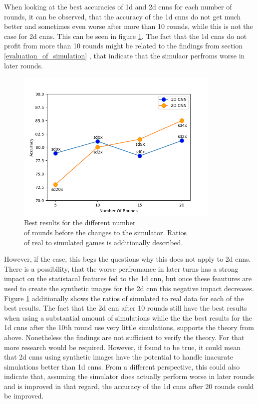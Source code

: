 \begin{minipage}[c]{0.4\textwidth}
	When looking at the best accuracies of 1d and 2d cnns for each number of rounds, it can be observed, that the accuracy of the 1d cnns do not get much better and sometimes even worse after more than 10 rounds, while this is not the case for 2d cnns. This can be seen in figure \ref{fig:bestAccPlot}. The fact that the 1d cnns do not profit from more than 10 rounds might be related to the findings from section \ref{evaluation_of_simulation} , that indicate that the simulaor perfroms worse in later rounds.
\end{minipage}
\begin{minipage}[c]{0.6\textwidth}
	\begin{figure}[H]
		\centering
		\includegraphics[width=9.8cm]{images/bestAccPlot.png}
		\caption[Bild kurz]{Best results for the different number\\\hspace{0\textheight} of rounds before the changes to the simulator. Ratios\\\hspace{0\textheight} of real to simulated games is additionally described.}
		\label{fig:bestAccPlot}
	\end{figure}
\end{minipage}

 However, if the case, this begs the questions why this does not apply to 2d cnns. There is a possibility, that the worse perfromance in later turns has a strong impact on the statistacal features fed to the 1d cnn, but once these feautures are used to create the synthetic images for the 2d cnn this negative impact decreases. Figure \ref{fig:bestAccPlot} additionally shows the ratios of simulated to real data for each of the best results. The fact that the 2d cnn after 10 rounds still have the best results when using a substantial amount of simulations while the the best results for the 1d cnns after the 10th round use very little simulations, supports the theory from above. Nonetheless the findings are not sufficient to verify the theory. For that more research would be required. However, if found to be true, it could mean that 2d cnns using synthetic images have the potential to handle inacurate simulations better than 1d cnns. From a different perspective, this could also indicate that, assuming the simulator does actually perform worse in later rounds and is improved in that regard, the accuracy of the 1d cnns after 20 rounds could be improved.


